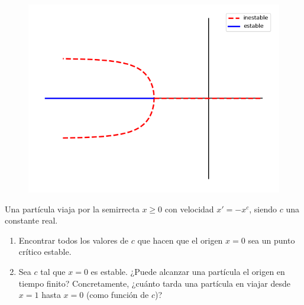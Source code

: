 \documentclass[11pt]{report}
\begin{document}
\begin{solution}
\begin{figure}[H]
        \includegraphics[scale=0.5]{img/13.png}
    \end{figure}
\end{solution}

\begin{exercise}
    Una partícula viaja por la semirrecta $x \geq 0$ con velocidad $x' = -x^c$, siendo $c$ una constante real.
    \begin{enumerate}
        \item Encontrar todos los valores de $c$ que hacen que el origen $x = 0$ sea un punto crítico estable.
        \item Sea $c$ tal que $x = 0$ es estable. ¿Puede alcanzar una partícula el origen en tiempo finito? Concretamente, ¿cuánto tarda una partícula en viajar desde $x = 1$ hasta $x = 0$ (como función de $c$)?
    \end{enumerate}
\end{exercise}
\end{document}
